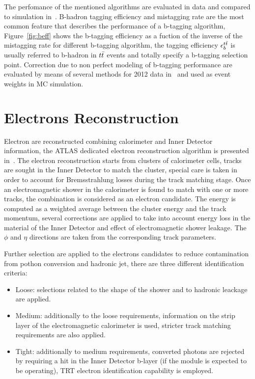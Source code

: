 The perfomance of the mentioned algorithms are evaluated in data  and compared to simulation in~\cite{btagPerf}.
B-hadron tagging efficiency and mistagging rate are the most common feature that describes the performance of a
b-tagging algorithm, Figure~\ref{fig:beff} shows the b-tagging efficiency as a fuction of the inverse of the mistagging rate
for different b-tagging algorithm, the tagging efficiency $\epsilon_b^{t\bar{t}}$ is usually referred to b-hadron in $t\bar{t}$ events
and totally specify a b-tagging selection point.
Correction due to non perfect modeling of b-tagging performance are evaluated by means of several methods
for 2012 data in~\cite{BtaggingScaleFactors, BtaggingScaleFactorsNew} and used as event weights in MC simulation.



\section{Electrons Reconstruction} \label{sec:elec}
Electron are reconstructed combining calorimeter and Inner Detector information,
the ATLAS dedicated electron reconstruction algorithm is presented in~\cite{electronAlgo}.
The electron reconstruction starts from clusters of calorimeter cells, 
tracks are sought in the Inner Detector to match the cluster, special care is taken in order to account for 
Bremsstrahlung losses during the track matching stage. Once an electromagnetic shower in the calorimeter is 
found to match with one or more tracks, the combination is considered as an electron candidate.  The energy is computed as 
a weighted average between the cluster energy and the track momentum, several corrections are applied to
take into account energy loss in the material of the Inner Detector and effect of electromagnetic shower 
leakage. The $\phi$  and $\eta$ directions are taken from the corresponding track parameters. 

Further selection are applied to the electrons candidates to reduce contamination
from pothon conversion and hadronic jet, there are three different identification criteria:
\begin{itemize}
	\item Loose: selections related to the shape of the shower and to hadronic leackage are applied.
	\item Medium: additionally to the loose requirements, information on the strip layer of the electromagnetic
	calorimeter is used, stricter track matching requirements are also applied.
	\item Tight: additionally to medium requirements, 
		converted photons are rejected by requiring a hit in the Inner Detector b-layer (if the module
		is expected to be operating), TRT electron identification capability is employed.
\end{itemize}

